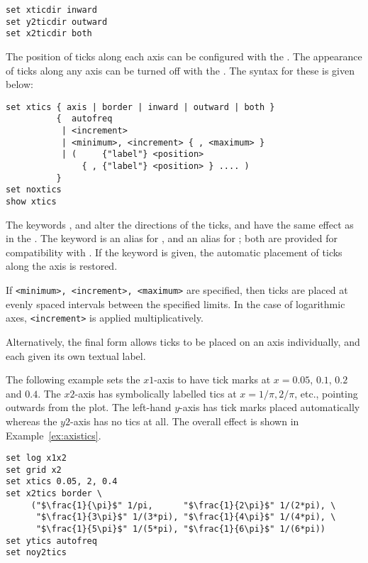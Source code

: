 \begin{verbatim}
set xticdir inward
set y2ticdir outward
set x2ticdir both
\end{verbatim}

The position of ticks along each axis can be configured with the . The appearance of ticks along any axis can be turned off with the
. The syntax for these is given below:

\begin{verbatim}
set xtics { axis | border | inward | outward | both }
          {  autofreq
           | <increment>
           | <minimum>, <increment> { , <maximum> }
           | (     {"label"} <position>
               { , {"label"} <position> } .... )
          }
set noxtics
show xtics
\end{verbatim}

The keywords ,  and  alter the
directions of the ticks, and have the same effect as in the . The keyword  is an alias for , and
 an alias for ; both are provided for
compatibility with \gnuplot. If the keyword  is given, the
automatic placement of ticks along the axis is restored.

If {\tt <minimum>, <increment>, <maximum>} are specified, then ticks are
placed at evenly spaced intervals between the specified limits. In the case of
logarithmic axes, {\tt <increment>} is applied multiplicatively.

Alternatively, the final form allows ticks to be placed on an axis
individually, and each given its own textual label.

The following example sets the $x1$-axis to have tick marks at
$x=0.05$, $0.1$, $0.2$ and $0.4$.  The $x2$-axis has symbolically labelled tics at
$x=1/\pi, 2/\pi$, etc., pointing outwards from the plot.  The left-hand
$y$-axis has tick marks placed automatically whereas the $y2$-axis has no tics
at all.  The overall effect is shown in Example~\ref{ex:axistics}.

\begin{verbatim}
set log x1x2
set grid x2
set xtics 0.05, 2, 0.4
set x2tics border \
     ("$\frac{1}{\pi}$" 1/pi,      "$\frac{1}{2\pi}$" 1/(2*pi), \
      "$\frac{1}{3\pi}$" 1/(3*pi), "$\frac{1}{4\pi}$" 1/(4*pi), \
      "$\frac{1}{5\pi}$" 1/(5*pi), "$\frac{1}{6\pi}$" 1/(6*pi))
set ytics autofreq
set noy2tics
\end{verbatim}

